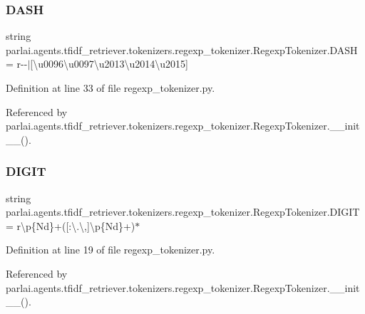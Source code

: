 \subsubsection{\texorpdfstring{D\+A\+SH}{DASH}}
{\footnotesize\ttfamily string parlai.\+agents.\+tfidf\+\_\+retriever.\+tokenizers.\+regexp\+\_\+tokenizer.\+Regexp\+Tokenizer.\+D\+A\+SH = r\textquotesingle{}-\/-\/$\vert$\mbox{[}\textbackslash{}u0096\textbackslash{}u0097\textbackslash{}u2013\textbackslash{}u2014\textbackslash{}u2015\mbox{]}\textquotesingle{}\hspace{0.3cm}{\ttfamily [static]}}



Definition at line 33 of file regexp\+\_\+tokenizer.\+py.



Referenced by parlai.\+agents.\+tfidf\+\_\+retriever.\+tokenizers.\+regexp\+\_\+tokenizer.\+Regexp\+Tokenizer.\+\_\+\+\_\+init\+\_\+\+\_\+().

\mbox{\label{classparlai_1_1agents_1_1tfidf__retriever_1_1tokenizers_1_1regexp__tokenizer_1_1RegexpTokenizer_a61b8759341e82c7907cebb9f50f52ae4}} 
\subsubsection{\texorpdfstring{D\+I\+G\+IT}{DIGIT}}
{\footnotesize\ttfamily string parlai.\+agents.\+tfidf\+\_\+retriever.\+tokenizers.\+regexp\+\_\+tokenizer.\+Regexp\+Tokenizer.\+D\+I\+G\+IT = r\textquotesingle{}\textbackslash{}p\{Nd\}+(\mbox{[}\+:\textbackslash{}.\textbackslash{},\mbox{]}\textbackslash{}p\{Nd\}+)$\ast$\textquotesingle{}\hspace{0.3cm}{\ttfamily [static]}}



Definition at line 19 of file regexp\+\_\+tokenizer.\+py.



Referenced by parlai.\+agents.\+tfidf\+\_\+retriever.\+tokenizers.\+regexp\+\_\+tokenizer.\+Regexp\+Tokenizer.\+\_\+\+\_\+init\+\_\+\+\_\+().

